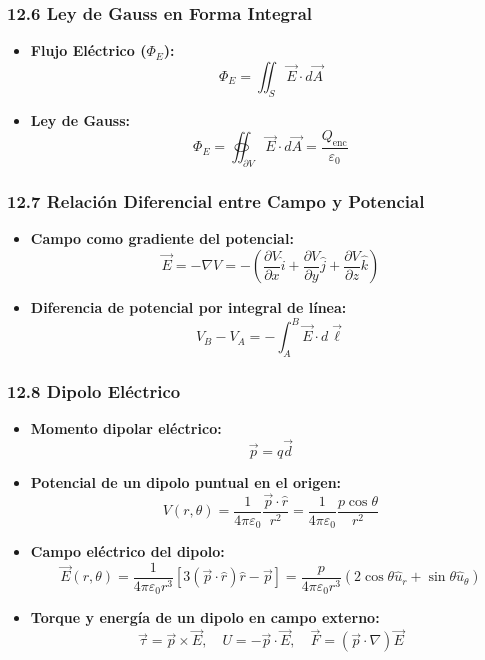 \documentclass[11pt,a4paper]{article}
\begin{document}
\subsubsection*{12.6 Ley de Gauss en Forma Integral}

\begin{itemize}
  \item \textbf{Flujo Eléctrico ($\Phi_E$):}
  \[
    \Phi_E = \iint_S \vec{E} \cdot d\vec{A}
  \]
  \item \textbf{Ley de Gauss:}
  \[
    \Phi_E = \oiint_{\partial V} \vec{E} \cdot d\vec{A} = \frac{Q_{\text{enc}}}{\varepsilon_0}
  \]
\end{itemize}

\subsubsection*{12.7 Relación Diferencial entre Campo y Potencial}

\begin{itemize}
  \item \textbf{Campo como gradiente del potencial:}
  \[
    \vec{E} = -\nabla V = -\left( \frac{\partial V}{\partial x}\hat{i} + \frac{\partial V}{\partial y}\hat{j} + \frac{\partial V}{\partial z}\hat{k} \right)
  \]
  \item \textbf{Diferencia de potencial por integral de línea:}
  \[
    V_B - V_A = -\int_A^B \vec{E} \cdot d\vec{\ell}
  \]
\end{itemize}

\subsubsection*{12.8 Dipolo Eléctrico}

\begin{itemize}
  \item \textbf{Momento dipolar eléctrico:}
  \[
    \vec{p} = q \vec{d}
  \]
  \item \textbf{Potencial de un dipolo puntual en el origen:}
  \[
    V(r, \theta) = \frac{1}{4\pi\varepsilon_0} \frac{\vec{p} \cdot \hat{r}}{r^2} = \frac{1}{4\pi\varepsilon_0} \frac{p \cos\theta}{r^2}
  \]
  \item \textbf{Campo eléctrico del dipolo:}
  \[
    \vec{E}(r, \theta) = \frac{1}{4\pi\varepsilon_0 r^3} \left[ 3(\vec{p} \cdot \hat{r})\hat{r} - \vec{p} \right] = \frac{p}{4\pi\varepsilon_0 r^3} (2\cos\theta \hat{u}_r + \sin\theta \hat{u}_\theta)
  \]
  \item \textbf{Torque y energía de un dipolo en campo externo:}
  \[
    \vec{\tau} = \vec{p} \times \vec{E}, \quad U = -\vec{p} \cdot \vec{E}, \quad \vec{F} = (\vec{p} \cdot \nabla)\vec{E}
  \]
\end{itemize}
\end{document}
